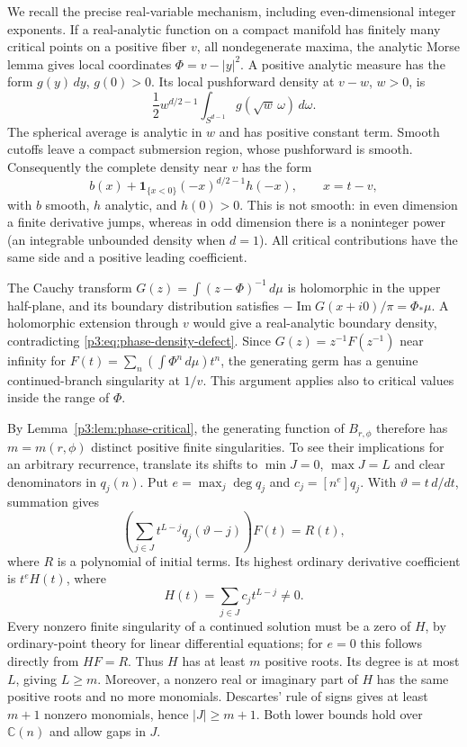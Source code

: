 \documentclass[11pt,a4paper]{article}
\theoremstyle{definition}
\theoremstyle{remark}
\numberwithin{equation}{section}
\begin{document}
We recall the precise real-variable mechanism, including even-dimensional
integer exponents. If a real-analytic function on a compact manifold has
finitely many critical points on a positive fiber $v$, all nondegenerate
maxima, the analytic Morse lemma gives local coordinates
$\Phi=v-|y|^2$. A positive analytic measure has the form $g(y)\,dy$,
$g(0)>0$. Its local pushforward density at $v-w$, $w>0$, is
\[
 \frac12w^{d/2-1}\int_{S^{d-1}}g(\sqrt w\,\omega)\,d\omega.
\]
The spherical average is analytic in $w$ and has positive constant
term. Smooth cutoffs leave a compact submersion region, whose
pushforward is smooth. Consequently the complete density near $v$
has the form
\begin{equation}\label{p3:eq:phase-density-defect}
 b(x)+\mathbf1_{\{x<0\}}(-x)^{d/2-1}h(-x),
 \qquad x=t-v,
\end{equation}
with $b$ smooth, $h$ analytic, and $h(0)>0$.
This is not smooth: in even dimension a finite derivative jumps,
whereas in odd dimension there is a noninteger power (an integrable
unbounded density when $d=1$). All critical contributions have the
same side and a positive leading coefficient.

The Cauchy transform
$G(z)=\int(z-\Phi)^{-1}\,d\mu$ is holomorphic in the upper half-plane,
and its boundary distribution satisfies
$-\operatorname{Im}G(x+i0)/\pi=\Phi_*\mu$.
A holomorphic extension through $v$ would give a real-analytic
boundary density, contradicting \eqref{p3:eq:phase-density-defect}.
Since $G(z)=z^{-1}F(z^{-1})$ near infinity for
$F(t)=\sum_n(\int\Phi^n\,d\mu)t^n$, the generating germ has a
genuine continued-branch singularity at $1/v$. This argument applies
also to critical values inside the range of $\Phi$.

By Lemma~\ref{p3:lem:phase-critical}, the generating function of
$B_{r,\phi}$ therefore has $m=m(r,\phi)$ distinct positive finite
singularities. To see their implications for an arbitrary recurrence,
translate its shifts to $\min J=0$, $\max J=L$ and clear denominators
in $q_j(n)$. Put $e=\max_j\deg q_j$ and $c_j=[n^e]q_j$.
With $\vartheta=t\,d/dt$, summation gives
\[
 \left(\sum_{j\in J}t^{L-j}q_j(\vartheta-j)\right)F(t)=R(t),
\]
where $R$ is a polynomial of initial terms. Its highest ordinary
derivative coefficient is $t^eH(t)$, where
\[
 H(t)=\sum_{j\in J}c_jt^{L-j}\ne0.
\]
Every nonzero finite singularity of a continued solution must be a
zero of $H$, by ordinary-point theory for linear differential
equations; for $e=0$ this follows directly from $HF=R$.
Thus $H$ has at least $m$ positive roots. Its degree is at most $L$,
giving $L\geq m$.
Moreover, a nonzero real or imaginary part of $H$ has the same
positive roots and no more monomials. Descartes' rule of signs gives
at least $m+1$ nonzero monomials, hence $|J|\geq m+1$.
Both lower bounds hold over $\mathbb C(n)$ and allow gaps in $J$.
\end{document}
